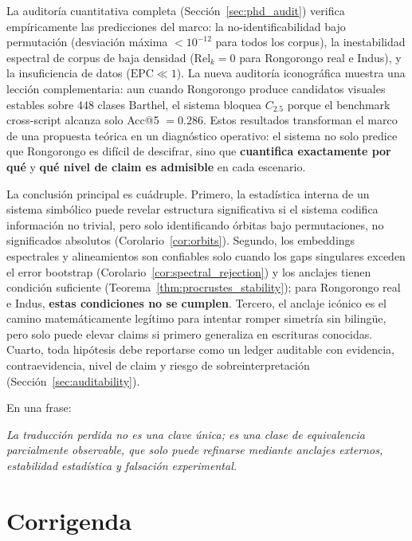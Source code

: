 \documentclass[11pt,a4paper]{article}
\newcommand{\1}{\mathbf{1}}
\numberwithin{equation}{section}
\begin{document}
La auditoría cuantitativa completa (Sección~\ref{sec:phd_audit}) verifica empíricamente las predicciones del marco: la no-identificabilidad bajo permutación (desviación máxima $<10^{-12}$ para todos los corpus), la inestabilidad espectral de corpus de baja densidad ($\mathrm{Rel}_k = 0$ para Rongorongo real e Indus), y la insuficiencia de datos ($\mathrm{EPC} \ll 1$). La nueva auditoría iconográfica muestra una lección complementaria: aun cuando Rongorongo produce candidatos visuales estables sobre 448 clases Barthel, el sistema bloquea $C_{2.5}$ porque el benchmark cross-script alcanza solo Acc@5 $=0.286$. Estos resultados transforman el marco de una propuesta teórica en un diagnóstico operativo: el sistema no solo predice que Rongorongo es difícil de descifrar, sino que \textbf{cuantifica exactamente por qué} y \textbf{qué nivel de claim es admisible} en cada escenario.

La conclusión principal es cuádruple. Primero, la estadística interna de un sistema simbólico puede revelar estructura significativa si el sistema codifica información no trivial, pero solo identificando órbitas bajo permutaciones, no significados absolutos (Corolario~\ref{cor:orbits}). Segundo, los embeddings espectrales y alineamientos son confiables solo cuando los gaps singulares exceden el error bootstrap (Corolario~\ref{cor:spectral_rejection}) y los anclajes tienen condición suficiente (Teorema~\ref{thm:procrustes_stability}); para Rongorongo real e Indus, \textbf{estas condiciones no se cumplen}. Tercero, el anclaje icónico es el camino matemáticamente legítimo para intentar romper simetría sin bilingüe, pero solo puede elevar claims si primero generaliza en escrituras conocidas. Cuarto, toda hipótesis debe reportarse como un ledger auditable con evidencia, contraevidencia, nivel de claim y riesgo de sobreinterpretación (Sección~\ref{sec:auditability}).

En una frase:

\begin{center}
\Large
\emph{La traducción perdida no es una clave única; es una clase de equivalencia parcialmente observable, que solo puede refinarse mediante anclajes externos, estabilidad estadística y falsación experimental.}
\end{center}

\section{Corrigenda}
\label{sec:corrigenda}
\end{document}
